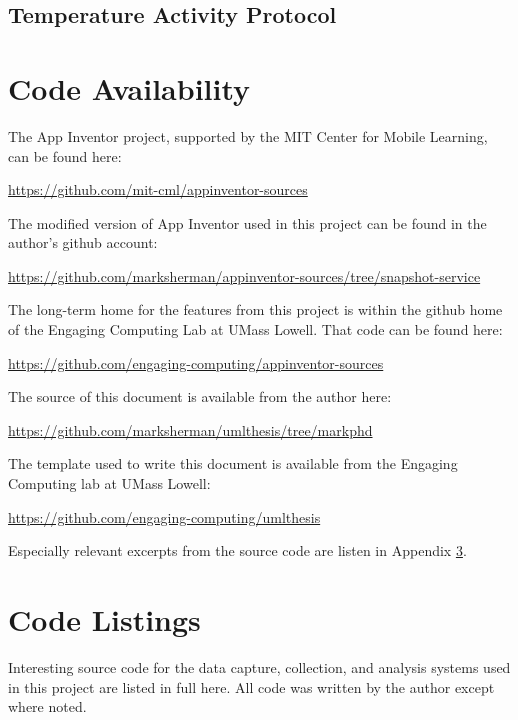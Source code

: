 \section{Temperature Activity Protocol}

\label{sec:IRB:temperature}



\chapter{Code Availability}

\noindent The App Inventor project, supported by the MIT Center for Mobile Learning, can be found here:

\noindent \url{https://github.com/mit-cml/appinventor-sources}

\noindent The modified version of App Inventor used in this project can be found in the author's github account:

\noindent \url{https://github.com/marksherman/appinventor-sources/tree/snapshot-service}

\noindent The long-term home for the features from this project is within the github home of the Engaging Computing Lab at UMass Lowell. That code can be found here:

\noindent \url{https://github.com/engaging-computing/appinventor-sources}

\noindent The source of this document is available from the author here:

\noindent \url{https://github.com/marksherman/umlthesis/tree/markphd}

\noindent The template used to write this document is available from the Engaging Computing lab at UMass Lowell:

\noindent \url{https://github.com/engaging-computing/umlthesis}

\noindent Especially relevant excerpts from the source code are listen in Appendix \ref{appendix:listings}.

\chapter{Code Listings} \label{appendix:listings}

Interesting source code for the data capture, collection, and analysis systems used in this project are listed in full here. All code was written by the author except where noted.

